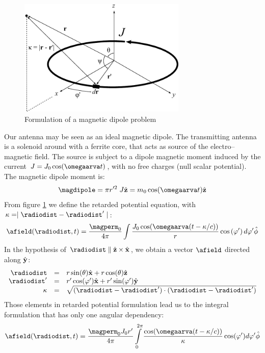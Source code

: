 \begin{figure}[h]
	\centering
	\includegraphics[width=8cm]{ch2/img/dipolo_magnetico.pdf}
	\caption{Formulation of a magnetic dipole problem}
	\label{eq:dipolomagnetico}
\end{figure}
Our antenna may be seen as an ideal magnetic dipole. The transmitting antenna is a solenoid around with a ferrite core, that acts as source of the electro--magnetic field. The source is subject to a dipole magnetic moment induced by the current $J = J_0 \cos(\omegaarva t)$, with no free charges (null scalar potential). The magnetic dipole moment is:
\begin{equation}
\magdipole = \pi r'^2\; J \vrz = m_0 \cos(\omegaarva t) \vrz
\end{equation}
From figure \ref{eq:dipolomagnetico} we define the retarded potential equation, with $\kappa = \mid \radiodist-\radiodist'\mid$:
\[
\afield(\radiodist,t) = \dfrac{\magperm_0}{4\pi}\int{\dfrac{J_0\cos(\omegaarva (t - \kappa/c))}{r}\ccos{\varphi'}d\varphi'}\hat{\phi}
\]
In the hypothesis of $\radiodist\parallel\vrz\times\vrx$, we obtain a vector $\afield$ directed along $\hat{\mathbf{y}}$:
\[\begin{array}{rcl}
\radiodist & = & r \sin(\theta) \vrx + r \cos(\theta) \vrz \\
\radiodist' & = & r' \cos(\varphi') \vrx + r' \sin(\varphi') \vry \\
\kappa & = & \sqrt{(\radiodist - \radiodist')\cdot(\radiodist - \radiodist')}
\end{array}\]
Those elements in retarded potential formulation lead us to the integral formulation that has only one angular dependency:
\begin{equation}
\label{eq:integraledacalc}
\afield(\radiodist,t) = \dfrac{\magperm_0 J_0 r'}{4\pi}\int\limits_{0}^{2\pi}{\dfrac{\cos(\omegaarva (t - \kappa/c))}{\kappa} \cos(\varphi') d\varphi' \hat{\phi}}
\end{equation}

